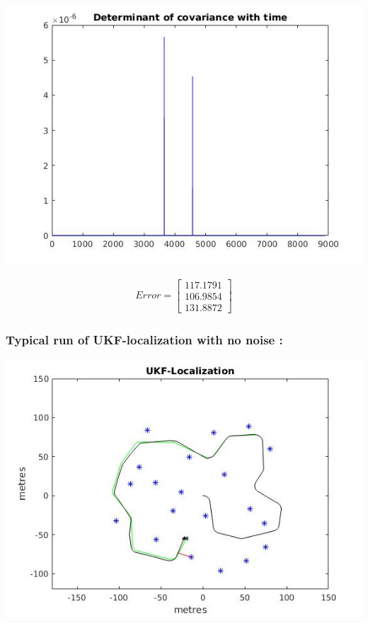 \documentclass[a4paper,fleqn,11pt]{article}
\theoremstyle{mytheor}
\begin{document}
\begin{center}
\includegraphics[scale = 0.37]{../images/UKF-perfect-control-cvt.jpg}
\end{center}

\begin{align*}
Error = \begin{bmatrix}
			117.1791\\
			106.9854\\
			131.8872
  		\end{bmatrix}
\end{align*}

\subsubsection{Typical run of UKF-localization with no noise :}

\begin{center}
\includegraphics[scale = 0.74]{../images/UKF-no-noise.jpg} \\
\end{center}
\end{document}

